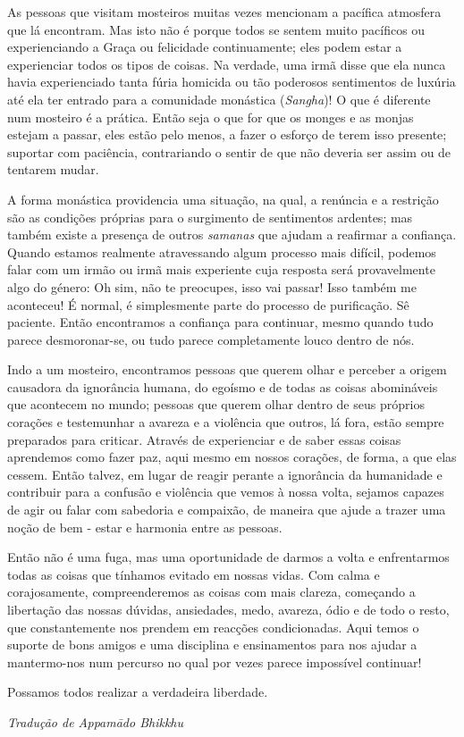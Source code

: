 As pessoas que visitam mosteiros muitas vezes mencionam a pacífica
atmosfera que lá encontram. Mas isto não é porque todos se sentem muito
pacíficos ou experienciando a Graça ou felicidade continuamente; eles
podem estar a experienciar todos os tipos de coisas. Na verdade, uma
irmã disse que ela nunca havia experienciado tanta fúria homicida ou tão
poderosos sentimentos de luxúria até ela ter entrado para a comunidade
monástica (\emph{Sangha})! O que é diferente num mosteiro é a prática.
Então seja o que for que os monges e as monjas estejam a passar, eles
estão pelo menos, a fazer o esforço de terem isso presente; suportar com
paciência, contrariando o sentir de que não deveria ser assim ou de
tentarem mudar.

A forma monástica providencia uma situação, na qual, a renúncia e a
restrição são as condições próprias para o surgimento de sentimentos
ardentes; mas também existe a presença de outros \emph{samanas} que
ajudam a reafirmar a confiança. Quando estamos realmente atravessando
algum processo mais difícil, podemos falar com um irmão ou irmã mais
experiente cuja resposta será provavelmente algo do género: Oh sim, não
te preocupes, isso vai passar! Isso também me aconteceu! É normal, é
simplesmente parte do processo de purificação. Sê paciente. Então
encontramos a confiança para continuar, mesmo quando tudo parece
desmoronar-se, ou tudo parece completamente louco dentro de nós.

Indo a um mosteiro, encontramos pessoas que querem olhar e perceber a
origem causadora da ignorância humana, do egoísmo e de todas as coisas
abomináveis que acontecem no mundo; pessoas que querem olhar dentro de
seus próprios corações e testemunhar a avareza e a violência que outros,
lá fora, estão sempre preparados para criticar. Através de experienciar
e de saber essas coisas aprendemos como fazer paz, aqui mesmo em nossos
corações, de forma, a que elas cessem. Então talvez, em lugar de reagir
perante a ignorância da humanidade e contribuir para a confusão e
violência que vemos à nossa volta, sejamos capazes de agir ou falar com
sabedoria e compaixão, de maneira que ajude a trazer uma noção de bem -
estar e harmonia entre as pessoas.

Então não é uma fuga, mas uma oportunidade de darmos a volta e
enfrentarmos todas as coisas que tínhamos evitado em nossas vidas. Com
calma e corajosamente, compreenderemos as coisas com mais clareza,
começando a libertação das nossas dúvidas, ansiedades, medo, avareza,
ódio e de todo o resto, que constantemente nos prendem em reacções
condicionadas. Aqui temos o suporte de bons amigos e uma disciplina e
ensinamentos para nos ajudar a mantermo-nos num percurso no qual por
vezes parece impossível continuar!

Possamos todos realizar a verdadeira liberdade.

\bigskip

{\raggedleft\itshape
  Tradução de Appamādo Bhikkhu
\par}